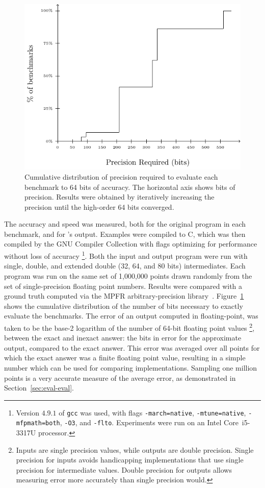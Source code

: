 \documentclass[paper.tex]{subfiles}
\begin{document}
\begin{figure}
\includegraphics[width=0.9\columnwidth]{fig/eval-mpfr-bits.pdf}
\caption{Cumulative distribution of precision required to evaluate
  each benchmark to 64 bits of accuracy. The horizontal axis shows
  bits of precision. Results were obtained by iteratively increasing
  the precision until the high-order 64 bits converged.}
\label{fig:eval-mpfr-bits}
\end{figure}

The accuracy and speed was measured, both for the original program in
each benchmark, and for \casio's output.  Examples were compiled to C,
which was then compiled by the GNU Compiler Collection with flags
optimizing for performance without loss of accuracy%
\footnote{Version $4.9.1$ of \texttt{gcc} was used, with flags
  \texttt{-march=native}, \texttt{-mtune=native},
  \texttt{-mfpmath=both}, \texttt{-O3}, and \texttt{-flto}.
  Experiments were run on an Intel Core~i5-3317U processor.}.
  Both the input and output
program were run with single, double, and extended double (32, 64, and
80 bits) intermediates.  Each program was run on the same set of
1,000,000 points drawn randomly from the set of single-precision
floating point numbers.  Results were compared with a ground truth
computed via the MPFR arbitrary-precision library~\cite{acm07-mpfr}.
Figure~\ref{fig:eval-mpfr-bits} shows the cumulative distribution of
the number of bits necessary to exactly evaluate the benchmarks.  The
error of an output computed in floating-point, was taken to be the
base-2 logarithm of the number of 64-bit floating point values%
\footnote{Inputs are single precision values, while outputs are double
  precision.  Single precision for inputs avoids handicapping
  implementations that use single precision for intermediate values.
  Double precision for outputs allows measuring error more accurately
  than single precision would.}, between the exact and inexact answer:
the bits in error for the approximate output, compared to the exact
answer.  This error was averaged over all points for which the exact
answer was a finite floating point value, resulting in a simple number
which can be used for comparing implementations.  Sampling one million
points is a very accurate measure of the average error, as
demonstrated in Section~\ref{sec:eval-eval}.
\end{document}
